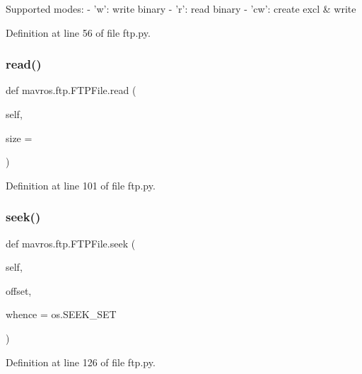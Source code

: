 \begin{DoxyVerb}Supported modes:
    - 'w': write binary
    - 'r': read binary
    - 'cw': create excl & write
\end{DoxyVerb}
 

Definition at line 56 of file ftp.\+py.

\mbox{\label{classmavros_1_1ftp_1_1FTPFile_a5be56ce2d69a2218f265ebd06da8b87c}} 
\subsubsection{\texorpdfstring{read()}{read()}}
{\footnotesize\ttfamily def mavros.\+ftp.\+F\+T\+P\+File.\+read (\begin{DoxyParamCaption}\item[{}]{self,  }\item[{}]{size = {} }\end{DoxyParamCaption})}



Definition at line 101 of file ftp.\+py.

\mbox{\label{classmavros_1_1ftp_1_1FTPFile_a3fed06e798361b6267a1c06f6f76483e}} 
\subsubsection{\texorpdfstring{seek()}{seek()}}
{\footnotesize\ttfamily def mavros.\+ftp.\+F\+T\+P\+File.\+seek (\begin{DoxyParamCaption}\item[{}]{self,  }\item[{}]{offset,  }\item[{}]{whence = {\ttfamily os.SEEK\+\_\+SET} }\end{DoxyParamCaption})}



Definition at line 126 of file ftp.\+py.

\mbox{\label{classmavros_1_1ftp_1_1FTPFile_a1eae7ed6dd89b65f0197b3fd347422b6}} 
